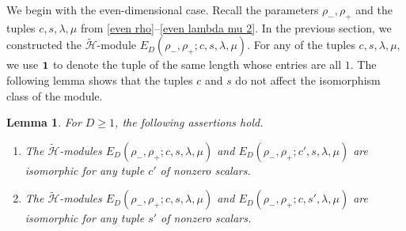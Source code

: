 \documentclass[reqno]{amsart}
\newtheorem{lemma}[theorem]{Lemma}
\theoremstyle{definition}
\begin{document}
We begin with the even-dimensional case.
Recall the parameters $\rho_-,\rho_+$ and the tuples
$c,s,\lambda,\mu$ from
\eqref{even rho}--\eqref{even lambda mu 2}.
In the previous section, we constructed the
$\widetilde{\mathcal{H}}$-module
$E_D(\rho_-,\rho_+;c,s,\lambda,\mu)$.
For any of the tuples $c,s,\lambda,\mu$, we use ${\bf 1}$
to denote the tuple of the same length whose entries are all $1$.
The following lemma shows that the tuples $c$ and $s$ do not affect 
the isomorphism class of the module.


\begin{lemma}\label{even parameter}
%
For $D\geq 1$, the following assertions hold.
\begin{enumerate}
\item[\rm(i)]
The $\widetilde{\mathcal{H}}$-modules
$E_D(\rho_-,\rho_+;c,s,\lambda,\mu)$ and
$E_D(\rho_-,\rho_+;c',s,\lambda,\mu)$
are isomorphic for any tuple $c'$ of nonzero scalars.

\item[\rm(ii)]
The $\widetilde{\mathcal{H}}$-modules
$E_D(\rho_-,\rho_+;c,s,\lambda,\mu)$ and
$E_D(\rho_-,\rho_+;c,s',\lambda,\mu)$
are isomorphic for any tuple $s'$ of nonzero scalars.
\end{enumerate}
%
\end{lemma}
\end{document}
